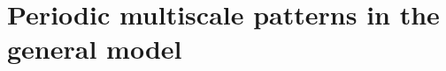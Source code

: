 \documentclass[a4paper,10pt,abstract=true,parskip=true]{scrartcl}
\theoremstyle{remark}
\numberwithin{equation}{section}
\numberwithin{thm}{section}
\newcommand{\eps}{\varepsilon}
\begin{document}



\section{Periodic multiscale patterns in the general model %
}\label{sec:patterns_general}
\end{document}
